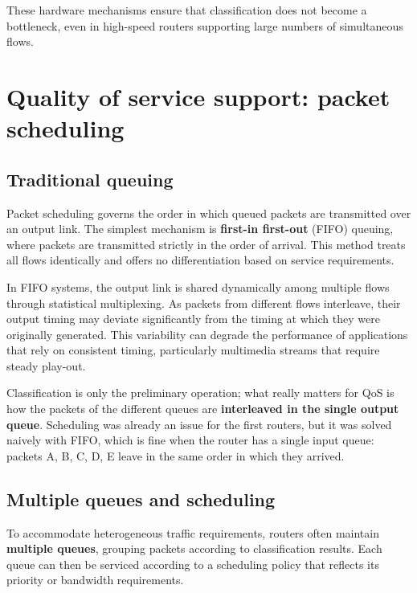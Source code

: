 These hardware mechanisms ensure that classification does not become a bottleneck, even in high-speed routers supporting large numbers of simultaneous flows.

\section{Quality of service support: packet scheduling}

\subsection{Traditional queuing}

Packet scheduling governs the order in which queued packets are transmitted over an output link. The simplest mechanism is \textbf{first-in first-out} (FIFO) queuing, where packets are transmitted strictly in the order of arrival. This method treats all flows identically and offers no differentiation based on service requirements.

\begin{center}
\end{center}

In FIFO systems, the output link is shared dynamically among multiple flows through statistical multiplexing. As packets from different flows interleave, their output timing may deviate significantly from the timing at which they were originally generated. This variability can degrade the performance of applications that rely on consistent timing, particularly multimedia streams that require steady play-out.


Classification is only the preliminary operation; what really matters for QoS is how the packets of the different queues are \textbf{interleaved in the single output queue}. Scheduling was already an issue for the first routers, but it was solved naively with FIFO, which is fine when the router has a single input queue: packets A, B, C, D, E leave in the same order in which they arrived.

\subsection{Multiple queues and scheduling}

To accommodate heterogeneous traffic requirements, routers often maintain \textbf{multiple queues}, grouping packets according to classification results. Each queue can then be serviced according to a scheduling policy that reflects its priority or bandwidth requirements.

